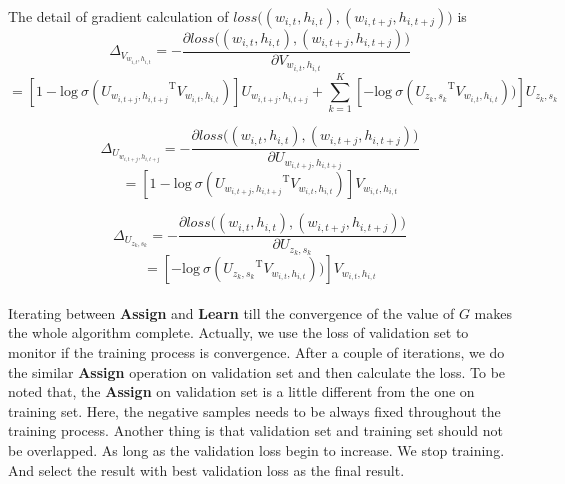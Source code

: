 The detail of gradient calculation of $loss\big ( (w_{i,t},h_{i,t}),(w_{i,t+j},h_{i,t+j})\big )$ is
$$\Delta_{V_{w_{i,t},h_{i,t}}} = -\frac{\partial loss\big ( (w_{i,t},h_{i,t}),(w_{i,t+j},h_{i,t+j})\big )}{\partial V_{w_{i,t},h_{i,t}}} $$
$$= [1-\mathrm{log}\ \sigma({U_{w_{i,t+j},h_{i,t+j}}}^{\mathrm{T}}V_{w_{i,t},h_{i,t}})]
U_{w_{i,t+j},h_{i,t+j}}+\sum_{k=1}^K [-\mathrm{log}\ \sigma({U_{z_k,s_k}}^{\mathrm{T}}V_{w_{i,t},h_{i,t}}))]U_{z_k,s_k}$$

$$\Delta_{U_{w_{i,t+j},h_{i,t+j}}} = -\frac{\partial loss\big ( (w_{i,t},h_{i,t}),(w_{i,t+j},h_{i,t+j})\big )}{\partial U_{w_{i,t+j},h_{i,t+j}}}$$
$$=[1-\mathrm{log}\ \sigma({U_{w_{i,t+j},h_{i,t+j}}}^{\mathrm{T}}V_{w_{i,t},h_{i,t}})]
V_{w_{i,t},h_{i,t}}$$

$$\Delta_{U_{z_k,s_k}} = -\frac{\partial loss\big ( (w_{i,t},h_{i,t}),(w_{i,t+j},h_{i,t+j})\big )}{\partial U_{z_k,s_k}}$$
$$=[-\mathrm{log}\ \sigma({U_{z_k,s_k}}^{\mathrm{T}}V_{w_{i,t},h_{i,t}}))]V_{w_{i,t},h_{i,t}}$$


\paragraph{}
Iterating between \textbf{Assign} and \textbf{Learn} till the convergence of the value of $G$ makes the whole algorithm complete. Actually, we use the loss of validation set to monitor if the training process is convergence. After a couple of iterations, we do the similar \textbf{Assign} operation on validation set and then calculate the loss. To be noted that, the \textbf{Assign} on validation set is a little different from the one on training set. Here, the negative samples needs to be always fixed throughout the training process. Another thing is that validation set and training set should not be overlapped. As long as the validation loss begin to increase.  We stop training. And select the result with best validation loss as the final result. 

